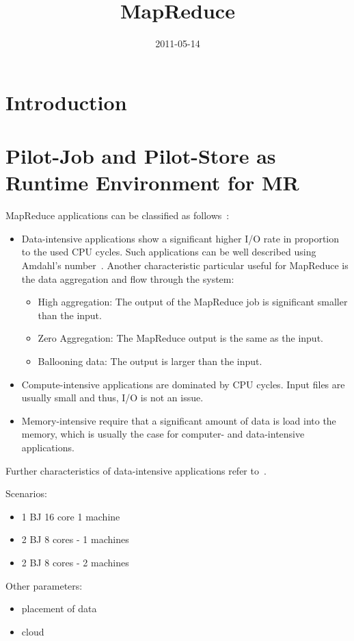 \documentclass[]{article}
\title{MapReduce}
\author{  }
\date{2011-05-14}
\begin{document}
\ifpdf
{}
\else
{}
\fi

\maketitle


\begin{abstract}
\end{abstract}

\section{Introduction}


\section{Pilot-Job and Pilot-Store as Runtime Environment for MR}

MapReduce applications can be classified as follows~\cite{weissman2011,ramakrishnan2011}:
\begin{itemize}
    \item Data-intensive applications show a significant higher I/O rate in proportion to the used CPU cycles. Such applications can be well described using Amdahl's number~\cite{gray2000}. Another characteristic particular useful for MapReduce is the data aggregation and flow through the system:
        \begin{itemize}
            \item High aggregation: The output of the MapReduce job is significant smaller than the input.
            \item Zero Aggregation: The MapReduce output is the same as the 
            input.
            \item Ballooning data: The output is larger than the input.
        \end{itemize}
    \item Compute-intensive applications are dominated by CPU cycles. Input 
    files are usually small and thus, I/O is not an issue.
    \item Memory-intensive require that a significant amount of data is load
    into the memory, which is usually the case for computer- and data-intensive 
    applications.
\end{itemize}
Further characteristics of data-intensive applications refer to~\cite{jha2011}.


Scenarios:
\begin{itemize}
	\item 1 BJ 16 core 1 machine
	\item 2 BJ 8 cores - 1 machines
	\item 2 BJ 8 cores - 2 machines
\end{itemize}



Other parameters:
\begin{itemize}
	\item placement of data
	\item cloud
\end{itemize}



\end{document}
